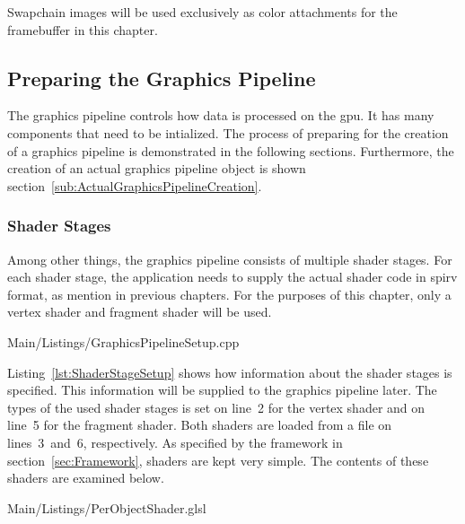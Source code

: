       Swapchain images will be used exclusively as color attachments for the framebuffer in this chapter.

    \subsection{Preparing the Graphics Pipeline}
    \label{subsec:GraphicsPipelineSetup}
      The graphics pipeline controls how data is processed on the \gls{gpu}.
      It has many components that need to be intialized.
      The process of preparing for the creation of a graphics pipeline is demonstrated in the following sections.
      Furthermore, the creation of an actual graphics pipeline object is shown section~\ref{sub:ActualGraphicsPipelineCreation}.

      \subsubsection{Shader Stages}
      \label{sss:GraphicsPipelineShaderStages}
        Among other things, the graphics pipeline consists of multiple shader stages.
        For each shader stage, the application needs to supply the actual shader code in \gls{spirv} format, as mention in previous chapters.
        For the purposes of this chapter, only a vertex shader and fragment shader will be used.

        
        {Main/Listings/GraphicsPipelineSetup.cpp}

        Listing~\ref{lst:ShaderStageSetup} shows how information about the shader stages is specified.
        This information will be supplied to the graphics pipeline later.
        The types of the used shader stages is set on line~2 for the vertex shader and on line~5 for the fragment shader.
        Both shaders are loaded from a file on lines~3~and~6, respectively.
        As specified by the framework in section~\ref{sec:Framework}, shaders are kept very simple.
        The contents of these shaders are examined below.

        
        {Main/Listings/PerObjectShader.glsl}

